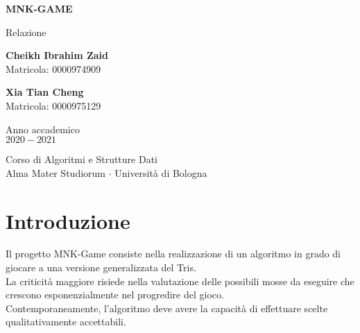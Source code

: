 \documentclass[11pt]{article}
\begin{document}
\begin{titlepage}
    \begin{center}
        \vspace*{1.5cm}
            
        \Huge
        \textbf{MNK-GAME}
            
        \vspace{0.5cm}
        \LARGE
        Relazione
            
        \vspace{1.5cm}
          
        \begin{minipage}[t]{0.47\textwidth}
        \begin{center}
        	{\large{\bf Cheikh Ibrahim Zaid}}\\
			{\large Matricola: 0000974909}
        \end{center}

		\end{minipage}
		\hfill
		\begin{minipage}[t]{0.47\textwidth}\raggedleft
		\begin{center}
        	{\large{\bf Xia Tian Cheng}}\\
			{\large Matricola: 0000975129}
        \end{center}
		\end{minipage}  
            
        \vspace{6cm}
            
        Anno accademico\\
        $2020 - 2021$
            
        \vspace{0.8cm}
            
            
        \Large
        Corso di Algoritmi e Strutture Dati\\
        Alma Mater Studiorum $\cdot$ Università di Bologna\\
            
    \end{center}
\end{titlepage}
\pagebreak


\section{Introduzione}
\justify
Il progetto MNK-Game consiste nella realizzazione di un algoritmo in grado di giocare a una versione generalizzata del Tris.\\
La criticità maggiore risiede nella valutazione delle possibili mosse da eseguire che crescono esponenzialmente nel progredire del gioco.\\
Contemporaneamente, l'algoritmo deve avere la capacità di effettuare scelte qualitativamente accettabili.
\end{document}
